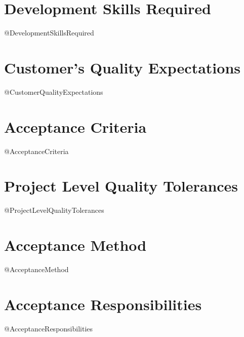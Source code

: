 \documentclass{report}
\begin{document}
\projectproduct
{}
\date{\today}
\author{@Author}

\maketitle

\tableofcontents

\newpage
\section{Development Skills Required}
@DevelopmentSkillsRequired

\section{Customer's Quality Expectations}
@CustomerQualityExpectations

\section{Acceptance Criteria}
@AcceptanceCriteria

\section{Project Level Quality Tolerances}
@ProjectLevelQualityTolerances

\section{Acceptance Method}
@AcceptanceMethod

\section{Acceptance Responsibilities}
@AcceptanceResponsibilities
\end{document}
